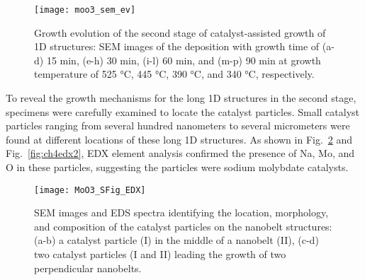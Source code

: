 \begin{figure}[htb]
\centering
\texttt{[image: moo3\_sem\_ev]}
\caption[Evolution of the second stage on  growth]{Growth evolution of the second stage of catalyst-assisted growth of  1D structures: SEM images of the deposition with growth time of (a-d) 15 min, (e-h) 30 min, (i-l) 60 min, and (m-p) 90 min at growth temperature of 525 \si{\degreeCelsius}, 445 \si{\degreeCelsius}, 390 \si{\degreeCelsius}, and 340 \si{\degreeCelsius}, respectively.}
\label{fig:ch4ev}
\end{figure}
To reveal the growth mechanisms for the long 1D structures in the second stage, specimens were carefully examined to locate the catalyst particles. Small catalyst particles ranging from several hundred nanometers to several micrometers were found at different locations of these long 1D structures. As shown in Fig.~\ref{fig:ch4edx1} and Fig.~\ref{fig:ch4edx2}, EDX element analysis confirmed the presence of Na, Mo, and O in these particles, suggesting the particles were sodium molybdate catalysts.  

\begin{figure}[htb]
\centering
\texttt{[image: MoO3\_SFig\_EDX]}
\caption[Identifying the catalyst particles on the nanobelt structures]{SEM images and EDS spectra identifying the location, morphology, and composition of the catalyst particles on the nanobelt structures: (a-b) a catalyst particle (I) in the middle of a nanobelt (II), (c-d) two catalyst particles (I and II) leading the growth of two perpendicular nanobelts.}
\label{fig:ch4edx1}
\end{figure}

